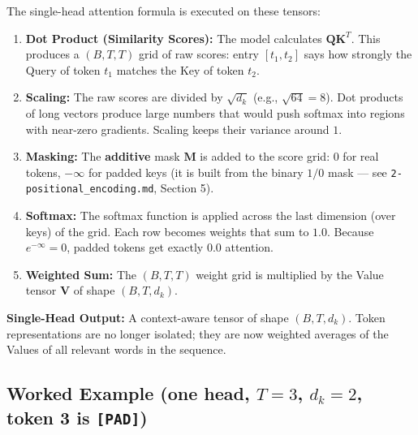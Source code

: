 \documentclass[11pt,a4paper,oneside]{report}
\providecommand{\tightlist}{\setlength{\itemsep}{0pt}\setlength{\parskip}{0pt}}
\begin{document}
The single-head attention formula is executed on these tensors:

\begin{center}\end{center}

\begin{enumerate}
\def\labelenumi{\arabic{enumi}.}
\tightlist
\item
  \textbf{Dot Product (Similarity Scores):} The model calculates \(\mathbf{Q}\mathbf{K}^T\). This produces a \((B, T, T)\) grid of raw scores: entry \([t_1, t_2]\) says how strongly the Query of token \(t_1\) matches the Key of token \(t_2\).
\item
  \textbf{Scaling:} The raw scores are divided by \(\sqrt{d_k}\) (e.g., \(\sqrt{64} = 8\)). Dot products of long vectors produce large numbers that would push softmax into regions with near-zero gradients. Scaling keeps their variance around \(1\).
\item
  \textbf{Masking:} The \textbf{additive} mask \(\mathbf{M}\) is added to the score grid: \(0\) for real tokens, \(-\infty\) for padded keys (it is built from the binary \(1/0\) mask --- see \texttt{2-positional\_\allowbreak{}encoding.\allowbreak{}md}, Section 5).
\item
  \textbf{Softmax:} The softmax function is applied across the last dimension (over keys) of the grid. Each row becomes weights that sum to \(1.0\). Because \(e^{-\infty} = 0\), padded tokens get exactly \(0.0\) attention.
\item
  \textbf{Weighted Sum:} The \((B, T, T)\) weight grid is multiplied by the Value tensor \(\mathbf{V}\) of shape \((B, T, d_k)\).
\end{enumerate}

\textbf{Single-Head Output:} A context-aware tensor of shape \((B, T, d_k)\). Token representations are no longer isolated; they are now weighted averages of the Values of all relevant words in the sequence.

\subsection{\texorpdfstring{Worked Example (one head, \(T = 3\), \(d_k = 2\), token 3 is \texttt{{[}PAD{]}})}{Worked Example (one head, T = 3, d\_k = 2, token 3 is {[}PAD{]})}}\label{worked-example-one-head-t--3-d_k--2-token-3-is-pad}
\end{document}
